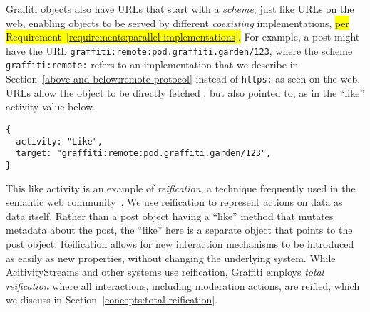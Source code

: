 Graffiti objects also have URLs that
start with a \emph{scheme}, just like URLs on the web,
enabling objects to be served by different \emph{coexisting} implementations,
\hl{%
per Requirement~{\ref{requirements:parallel-implementations}}.
}%
For example, a post might have the URL
\texttt{graffiti:\allowbreak{}remote:\allowbreak{}pod.\allowbreak{}graffiti.\allowbreak{}garden/\allowbreak{}123},
where the scheme \texttt{graffiti:\allowbreak{}remote:} refers to an implementation that we describe
in Section~\ref{above-and-below:remote-protocol}
instead of \texttt{https:} as seen on the web.
URLs allow the object to be directly fetched%
, but also pointed to, as in the
``like'' activity value below.


\begin{verbatim}
{
  activity: "Like",
  target: "graffiti:remote:pod.graffiti.garden/123",
}
\end{verbatim}

This like activity is an example of \emph{reification},
a technique frequently used in the semantic web community~\cite{rdfprimer}.   We use reification to represent actions on data as data itself.
Rather than a post object having a ``like'' method that mutates metadata about the post,
the ``like'' here is a separate object that points to the post object.
Reification allows for new interaction mechanisms to be introduced as easily as new properties,
without changing the underlying system.
While AcitivityStreams and other systems use reification,
Graffiti employs \emph{total reification} where
all interactions, including moderation actions, are reified,
which we discuss in
Section~\ref{concepts:total-reification}.

